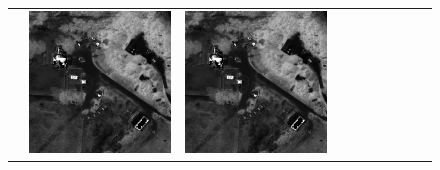 \begin{figure}[h!]
\begin{tabularx}{\textwidth}{c|*{9}{X}}
    & \includegraphics[trim={730pt 220pt 200pt 720pt},clip,width=\linewidth]{images/015Results/03ablation/comp_images/ndvi/523.png}
    & \includegraphics[trim={850pt 110pt 80pt 830pt},clip,width=\linewidth]{images/015Results/03ablation/comp_images/ndvi/523.png}

\end{tabularx}
\end{figure}
